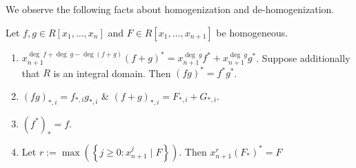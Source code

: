 We observe the following facts about homogenization and de-homogenization.
\begin{proposition}
    Let $f,g\in R[x_1,\dots,x_n]$ and $F\in R[x_1,\dots,x_{n+1}]$ be homogeneous.
    \begin{enumerate}
        \item $x_{n+1}^{\deg\ f +\deg \ g - \deg( f+g)}(f+g)^\ast=x_{n+1}^{\deg\ g}f^\ast + x_{n+1}^{\deg\ g}g^\ast$. Suppose additionally that $R$ is an integral domain. Then $(fg)^\ast=f^\ast g^\ast$.
        \item $(fg)_{\ast,i} = f_{\ast,i} g_{\ast,i}$ \& $(f+g)_{\ast,i} = F_{\ast,i}+G_{\ast,i}$. 
        \item $(f^\ast)_\ast = f$.
        \item Let $r:=\max\left(\left\{ j\geq0: x_{n+1}^j\mid F \right\}\right).$ Then $x_{n+1}^r(F_\ast)^\ast=F$
    \end{enumerate}
\end{proposition}
